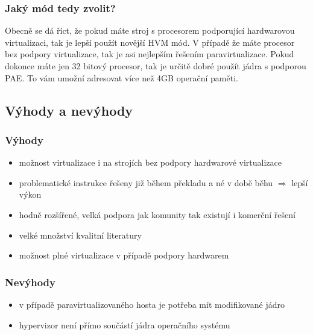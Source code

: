 \subsubsection{Jaký mód tedy zvolit?}
Obecně se dá říct, že pokud máte stroj s procesorem podporující hardwarovou virtualizaci, tak je lepší použít novější HVM mód. V případě že máte procesor bez podpory virtualizace, tak je asi nejlepším řešením paravirtualizace. Pokud dokonce máte jen 32 bitový procesor, tak je určitě dobré použít jádra s podporou PAE. To vám umožní adresovat více než 4GB operační paměti.

\subsection{Výhody a nevýhody}
\subsubsection{Výhody}
\begin{itemize}
  \item možnost virtualizace i na strojích bez podpory hardwarové virtualizace
  \item problematické instrukce řešeny již během překladu a né v době běhu $\Rightarrow$ lepší výkon
  \item hodně rozšířené, velká podpora jak komunity tak existují i komerční řešení
  \item velké množství kvalitní literatury
  \item možnost plné virtualizace v případě podpory hardwarem
\end{itemize}

\subsubsection{Nevýhody}
\begin{itemize}
  \item v případě paravirtualizovaného hosta je potřeba mít modifikované jádro
  \item hypervizor není přímo součástí jádra operačního systému
\end{itemize}

